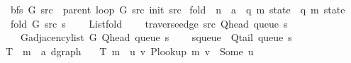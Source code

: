 \begin{isabellebody}
\ \ {\isachardoublequoteopen}bfs\ G\ src\ {\isasymequiv}\ parent\ {\isacharparenleft}{\kern0pt}loop\ G\ src\ {\isacharparenleft}{\kern0pt}init\ src{\isacharparenright}{\kern0pt}{\isacharparenright}{\kern0pt}{\isachardoublequoteclose}\isanewline
\isanewline
{}\isamarkupfalse%
\ fold\ {\isacharcolon}{\kern0pt}{\isacharcolon}{\kern0pt}\ {\isachardoublequoteopen}{\isacharprime}{\kern0pt}n\ {\isasymRightarrow}\ {\isacharprime}{\kern0pt}a\ {\isasymRightarrow}\ {\isacharparenleft}{\kern0pt}{\isacharprime}{\kern0pt}q{\isacharcomma}{\kern0pt}\ {\isacharprime}{\kern0pt}m{\isacharparenright}{\kern0pt}\ state\ {\isasymRightarrow}\ {\isacharparenleft}{\kern0pt}{\isacharprime}{\kern0pt}q{\isacharcomma}{\kern0pt}\ {\isacharprime}{\kern0pt}m{\isacharparenright}{\kern0pt}\ state{\isachardoublequoteclose}\ \isanewline
\ \ {\isachardoublequoteopen}fold\ G\ src\ s\ {\isasymequiv}\isanewline
\ \ \ List{\isachardot}{\kern0pt}fold\isanewline
\ \ \ \ {\isacharparenleft}{\kern0pt}traverse{\isacharunderscore}{\kern0pt}edge\ src\ {\isacharparenleft}{\kern0pt}Q{\isacharunderscore}{\kern0pt}head\ {\isacharparenleft}{\kern0pt}queue\ s{\isacharparenright}{\kern0pt}{\isacharparenright}{\kern0pt}{\isacharparenright}{\kern0pt}\isanewline
\ \ \ \ {\isacharparenleft}{\kern0pt}G{\isachardot}{\kern0pt}adjacency{\isacharunderscore}{\kern0pt}list\ G\ {\isacharparenleft}{\kern0pt}Q{\isacharunderscore}{\kern0pt}head\ {\isacharparenleft}{\kern0pt}queue\ s{\isacharparenright}{\kern0pt}{\isacharparenright}{\kern0pt}{\isacharparenright}{\kern0pt}\isanewline
\ \ \ \ {\isacharparenleft}{\kern0pt}s{\isasymlparr}queue\ {\isacharcolon}{\kern0pt}{\isacharequal}{\kern0pt}\ Q{\isacharunderscore}{\kern0pt}tail\ {\isacharparenleft}{\kern0pt}queue\ s{\isacharparenright}{\kern0pt}{\isasymrparr}{\isacharparenright}{\kern0pt}{\isachardoublequoteclose}\isanewline
\isanewline
{}\isamarkupfalse%
\ T\ {\isacharcolon}{\kern0pt}{\isacharcolon}{\kern0pt}\ {\isachardoublequoteopen}{\isacharprime}{\kern0pt}m\ {\isasymRightarrow}\ {\isacharprime}{\kern0pt}a\ dgraph{\isachardoublequoteclose}\ \isanewline
\ \ {\isachardoublequoteopen}T\ m\ {\isasymequiv}\ {\isacharbraceleft}{\kern0pt}{\isacharparenleft}{\kern0pt}u{\isacharcomma}{\kern0pt}\ v{\isacharparenright}{\kern0pt}{\isachardot}{\kern0pt}\ P{\isacharunderscore}{\kern0pt}lookup\ m\ v\ {\isacharequal}{\kern0pt}\ Some\ u{\isacharbraceright}{\kern0pt}{\isachardoublequoteclose}\isanewline
\isanewline
{}\isamarkupfalse%
%
\isadelimdocument
%
\endisadelimdocument
%
\isatagdocument
%

\end{isabellebody}
